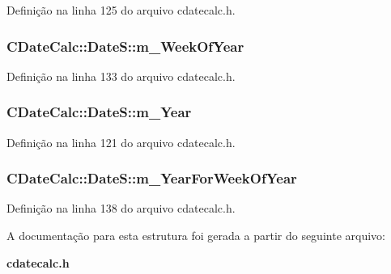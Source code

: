 Definição na linha 125 do arquivo cdatecalc.\+h.

\subsubsection[{m\+\_\+\+Week\+Of\+Year}]{ C\+Date\+Calc\+::\+Date\+S\+::m\+\_\+\+Week\+Of\+Year}\label{struct_c_date_calc_1_1_date_s_a2594ef52426f3b6c6fb8d2842685d7fc}


Definição na linha 133 do arquivo cdatecalc.\+h.

\subsubsection[{m\+\_\+\+Year}]{ C\+Date\+Calc\+::\+Date\+S\+::m\+\_\+\+Year}\label{struct_c_date_calc_1_1_date_s_a255283f0fa9e8823a43eb7ce55f77b93}


Definição na linha 121 do arquivo cdatecalc.\+h.

\subsubsection[{m\+\_\+\+Year\+For\+Week\+Of\+Year}]{ C\+Date\+Calc\+::\+Date\+S\+::m\+\_\+\+Year\+For\+Week\+Of\+Year}\label{struct_c_date_calc_1_1_date_s_a51e81ad3951b0a5a361940f8751760a1}


Definição na linha 138 do arquivo cdatecalc.\+h.



A documentação para esta estrutura foi gerada a partir do seguinte arquivo\+:\begin{DoxyCompactItemize}
\item 
{\bf cdatecalc.\+h}\end{DoxyCompactItemize}
